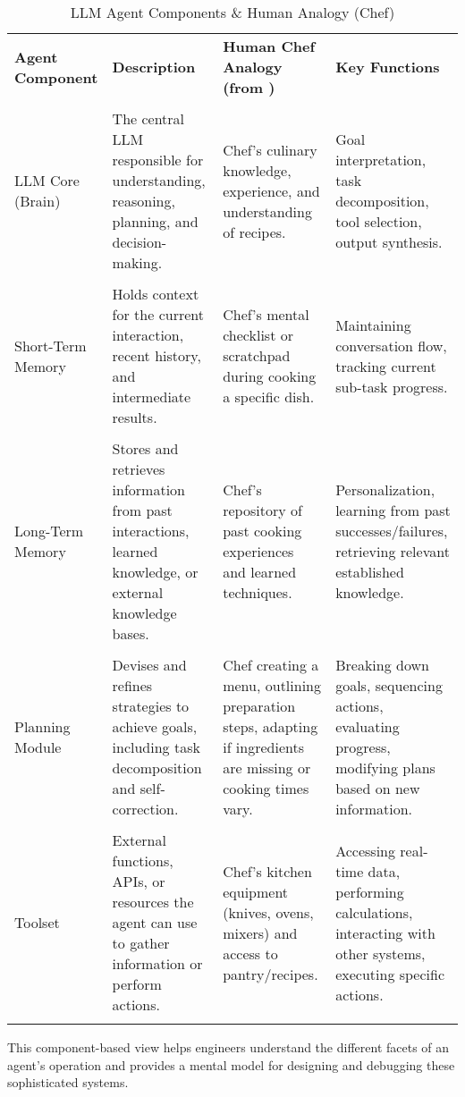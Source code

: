 \begin{table}[h!]
\centering
\caption{LLM Agent Components \& Human Analogy (Chef)}
\label{tab:agent_components_chef}
\begin{tabular}{>{\RaggedRight}p{} >{\RaggedRight}p{} >{\RaggedRight}p{} >{\RaggedRight}p{}}
\toprule
\textbf{Agent Component} & \textbf{Description} & \textbf{Human Chef Analogy (from )} & \textbf{Key Functions} \\\\
\midrule
LLM Core (Brain) & The central LLM responsible for understanding, reasoning, planning, and decision-making. & Chef's culinary knowledge, experience, 
and understanding of recipes. & Goal interpretation, task decomposition, tool selection, output synthesis. \\\\
Short-Term Memory & Holds context for the current interaction, recent history, and intermediate results. & Chef's mental checklist or scratchpad 
during cooking a specific dish. & Maintaining conversation flow, tracking current sub-task progress. \\\\
Long-Term Memory & Stores and retrieves information from past interactions, learned knowledge, or external knowledge bases. & Chef's repository 
of past cooking experiences and learned techniques. & Personalization, learning from past successes/failures, retrieving relevant established knowledge. \\\\
Planning Module & Devises and refines strategies to achieve goals, including task decomposition and self-correction. & Chef creating a menu, 
outlining preparation steps, adapting if ingredients are missing or cooking times vary. & Breaking down goals, sequencing actions, evaluating progress, modifying
 plans based on new information. \\\\
Toolset & External functions, APIs, or resources the agent can use to gather information or perform actions. & Chef's kitchen equipment (knives, ovens, mixers) 
and access to pantry/recipes. & Accessing real-time data, performing calculations, interacting with other systems, executing specific actions. \\\\
\bottomrule
\end{tabular}
\end{table}

This component-based view helps engineers understand the different facets of an agent's operation and provides a mental model for designing and debugging 
these sophisticated systems.

